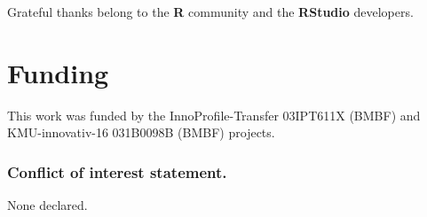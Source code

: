 \documentclass[a4,center,fleqn]{NAR}
\begin{document}
Grateful thanks belong to the \textbf{R} community and the \textbf{RStudio} 
developers.

\section{Funding}
This work was funded by the InnoProfile-Transfer 03IPT611X (BMBF) and 
KMU-innovativ-16 031B0098B (BMBF) projects.

\subsubsection{Conflict of interest statement.} None declared.



\end{document}
